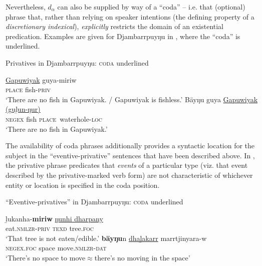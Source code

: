 \documentclass[output=paper]{langsci/langscibook}
\begin{document}
Nevertheless, $d_\alpha$ can also be supplied by way of a ``coda'' -- i.e.
that (optional) phrase that, rather than relying on speaker intentions (the
defining property of a \textit{discretionary indexical}),
\textit{explicitly} restricts the domain of an existential predication.
Examples are given for Djambarrpuyŋu in , where the ``coda'' is underlined.

\begin{exe}\ex Privatives in Djambarrpuyŋu: \textsc{coda} underlined
    \begin{xlist}
\ex\gll \underline{Gapuwiyak} guya-miriw\\
\textsc{place} fish-\textsc{priv}\\
\glt `There are no fish in Gapuwiyak. / Gapuwiyak is fishless.'
\ex\gll Bäyŋu guya \underline{Gapuwiyak (guḻun-ŋur)}\\
 \textsc{negex} fish \textsc{place}~waterhole-\textsc{loc}\\
    \glt `There are no fish in Gapuwiyak.'\end{xlist}\end{exe}
%
The availability of coda phrases additionally provides a syntactic location
    for the subject in the ``eventive-privative'' sentences that have been
    described above. In , the privative phrase
    predicates that \textit{events} of a particular type (viz. that event
    described by the privative-marked verb form) are not characteristic of
    whichever entity  or location
     is specified in the coda position.
%
\begin{exe}\ex\label{ex:austr-djamb-coda} 
    ``Eventive-privatives'' in Djambarrpuyŋu: \textsc{coda} underlined
    \begin{xlist}
    \ex\label{ex:austr-djamb-coda-edible} 
    \gll ḻukanha-\textbf{miriw} \underline{ŋunhi dharpany}\\
eat.\textsc{nmlzr}-\textsc{priv} \textsc{texd} tree.\textsc{foc}\\
\glt `That tree is not eaten\slash edible.'
    \ex\label{ex:austr-djamb-coda-space}
    \gll \textbf{bäyŋu}n \underline{dhaḻakarr} marrtjinyara-w\\
\textsc{negex}.\textsc{foc} space move.\textsc{nmlzr}-\textsc{dat}\\
\glt   `There's no space to move$\approx$there's no moving in the space'
    \end{xlist}\end{exe}
\end{document}
